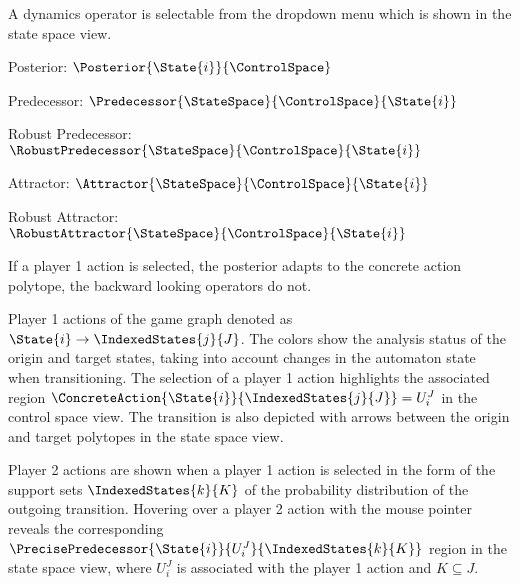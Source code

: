         A dynamics operator is selectable from the dropdown menu which is shown in the state space view.

        \startitemize[packed]
            \item{Posterior: $\Posterior{\State{i}}{\ControlSpace}$}
            \item{Predecessor: $\Predecessor{\StateSpace}{\ControlSpace}{\State{i}}$}
            \item{Robust Predecessor: $\RobustPredecessor{\StateSpace}{\ControlSpace}{\State{i}}$}
            \item{Attractor: $\Attractor{\StateSpace}{\ControlSpace}{\State{i}}$}
            \item{Robust Attractor: $\RobustAttractor{\StateSpace}{\ControlSpace}{\State{i}}$}
        \stopitemize

        If a player 1 action is selected, the posterior adapts to the concrete action polytope, the backward looking operators do not.

    \stopsubsubject

    \startsubsubject[title={Widget: Actions}]

        Player 1 actions of the game graph denoted as $\State{i} \rightarrow \IndexedStates{j}{J}$.
        The colors show the analysis status of the origin and target states, taking into account changes in the automaton state when transitioning.
        The selection of a player 1 action highlights the associated region $\ConcreteAction{\State{i}}{\IndexedStates{j}{J}} = U_i^J$ in the control space view.
        The transition is also depicted with arrows between the origin and target polytopes in the state space view.

        Player 2 actions are shown when a player 1 action is selected in the form of the support sets $\IndexedStates{k}{K}$ of the probability distribution of the outgoing transition.
        Hovering over a player 2 action with the mouse pointer reveals the corresponding $\PrecisePredecessor{\State{i}}{U_i^J}{\IndexedStates{k}{K}}$ region in the state space view, where $U_i^J$ is associated with the player 1 action and $K \subseteq J$.

    \stopsubsubject

\stopsubject


